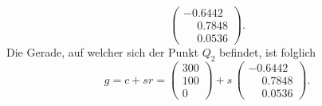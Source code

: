 \begin{loesung}
\begin{teilaufgaben}
\[\begin{pmatrix}
  -0.6442\\
  \phantom{-}0.7848\\
  \phantom{-}0.0536
\end{pmatrix}.
\]
Die Gerade, auf welcher sich der Punkt $Q_2$ befindet, ist folglich
\[
g = c + sr = 
\begin{pmatrix}
300\\
100\\
0
\end{pmatrix} + s\,
\begin{pmatrix}
-0.6442\\
\phantom{-}0.7848\\
\phantom{-}0.0536
\end{pmatrix}.
\]
\qedhere
\end{teilaufgaben}
\end{loesung}
